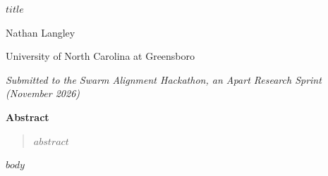 \documentclass[10pt,letterpaper]{article}
\begin{document}
\begin{center}
{\LARGE\bfseries $title$\par}\vspace{10pt}
{\large Nathan Langley\par}\vspace{2pt}
{University of North Carolina at Greensboro\par}\vspace{2pt}
{\itshape Submitted to the Swarm Alignment Hackathon, an Apart Research Sprint (November 2026)\par}
\end{center}
\vspace{4pt}
\begin{center}{\bfseries Abstract}\end{center}
\begin{quote}\small
$abstract$
\end{quote}
$body$
\end{document}
